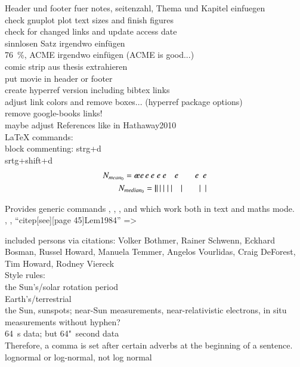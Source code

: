 	Header und footer fuer notes, seitenzahl, Thema und Kapitel einfuegen\\
	check gnuplot plot text sizes and finish figures\\
	
	check for changed links and update access date\\
	
	sinnlosen Satz irgendwo einfügen\\
	76~\%, ACME irgendwo einfügen (ACME is good...)\\
	comic strip aus thesis extrahieren\\
	put movie in header or footer\\

	create hyperref version including bibtex links\\
		adjust link colors and remove boxes... (hyperref package options)\\
		remove google-books links!\\
		maybe adjust References like in Hathaway2010\\


LaTeX commands:\\
block commenting: strg+d\\
srtg+shift+d\\

\begin{align}
	N_{mean_0} = e\!ee\,e\:e\;e\ e\quad e\qquad e\enskip e\\	%
	N_{median_0} = |\!||\,|\:|\;|\ |\quad|\qquad|\enskip|
\end{align}

Provides generic commands \degree, \celsius, \perthousand, \micro{} and \ohm{} which work both in text and maths mode.\\

\citet{Lem1984}, \citep{Lem1984}, ``citep[see][page 45]{Lem1984}'' => \citep[see][page 45]{Lem1984}

included persons via citations:
Volker Bothmer, Rainer Schwenn, Eckhard Bosman, Russel Howard, Manuela Temmer, Angelos Vourlidas, Craig DeForest, Tim Howard, Rodney Viereck\\

Style rules:\\
the Sun's/solar rotation period\\
Earth's/terrestrial\\
the Sun, sunspots; near-Sun measurements, near-relativistic electrons, in situ measurements without hyphen?\\
64~s data; but 64"~second data\\
Therefore, a comma is set after certain adverbs at the beginning of a sentence.\\
lognormal or log-normal, not log normal\\

